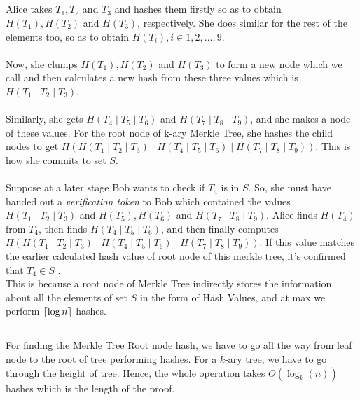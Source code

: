 \documentclass[12pt, a4paper]{article}
\DeclarePairedDelimiter{\ceil}{\lceil}{\rceil}
\newcommand{\ti}{\textit}
\begin{document}
\subsection{}
Alice takes $T_1, T_2$ and $ T_3$ and hashes them firstly so as to obtain $H(T_1), H(T_2)$ and $ H(T_3)$, respectively. She does similar for the rest of the elements too, so as to obtain $H(T_i), i \in {1, 2, ..., 9}$.
\\ \\
Now, she clumps $H(T_1), H(T_2)$ and $ H(T_3)$ to form a new node which we call and then calculates a new hash from these three values which is $H(T_1 \mid T_2 \mid T_3)$.  \\ \\
Similarly, she gets $H(T_4 \mid T_5 \mid T_6)$ and $H(T_7 \mid T_8 \mid T_9)$, and she makes a node of these values. For the root node of k-ary Merkle Tree, 
she hashes the child nodes to get $H(H(T_1 \mid T_2 \mid T_3) \mid H(T_4 \mid T_5 \mid T_6) \mid H(T_7 \mid T_8 \mid T_9))$. This is how she commits to set $S$. \\ \\ 
Suppose at a later stage Bob wants to check if $T_4$ is in $S$. So, she must have handed out a \ti{verification token} to Bob which contained the values 
$H(T_1 \mid T_2 \mid T_3)$ and $H(T_5), H(T_6)$ and $H(T_7 \mid T_8 \mid T_9)$. Alice finds $H(T_4)$ from $T_4$, then finds $H(T_4 \mid T_5 \mid T_6)$, and then finally computes $H(H(T_1 \mid T_2 \mid T_3) \mid H(T_4 \mid T_5 \mid T_6) \mid H(T_7 \mid T_8 \mid T_9))$. If this value matches the earlier calculated hash value of root node of this merkle tree, it's confirmed that $T_4 \in S$ .
\\ 
This is because a root node of Merkle Tree indirectly stores the information about all the elements of set $S$ in the form of Hash Values, and at max we perform $\ceil{\log n}$ hashes.

\subsection{}
For finding the Merkle Tree Root node hash, we have to go all the way from leaf node to the root of tree performing hashes. For a $k$-ary tree, we have to go through the height of tree. Hence, the whole operation takes $O(\log_k (n))$ hashes which is the length of the proof.
\end{document}
